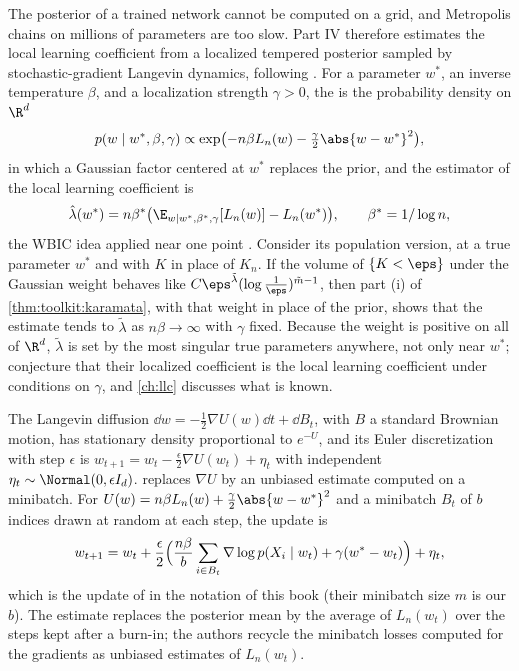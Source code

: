 \begin{refsection}
The posterior of a trained network cannot be computed on a grid, and Metropolis chains on millions of parameters are too slow. Part IV therefore estimates the local learning coefficient from a localized tempered posterior sampled by stochastic-gradient Langevin dynamics, following \textcite{LauEtAl2025}. For a parameter $w^*$, an inverse temperature $\beta$, and a localization strength $\gamma>0$, the  is the probability density on $\R^d$
\[
p(w\mid w^*,\beta,\gamma)\propto\exp\bigl(-n\beta L_n(w)-\tfrac\gamma2\abs{w-w^*}^2\bigr),
\]
in which a Gaussian factor centered at $w^*$ replaces the prior, and the estimator of the local learning coefficient is
\[
\hat\lambda(w^*)=n\beta^*\bigl(\E_{w\mid w^*,\beta^*,\gamma}[L_n(w)]-L_n(w^*)\bigr),\qquad\beta^*=1/\log n,
\]
the WBIC idea applied near one point \parencite[eqs.~(10) and (12)]{LauEtAl2025}. Consider its population version, at a true parameter $w^*$ and with $K$ in place of $K_n$. If the volume of $\{K<\eps\}$ under the Gaussian weight behaves like $C\eps^{\tilde\lambda}(\log\frac1\eps)^{\tilde m-1}$, then part (i) of \cref{thm:toolkit:karamata}, with that weight in place of the prior, shows that the estimate tends to $\tilde\lambda$ as $n\beta\to\infty$ with $\gamma$ fixed. Because the weight is positive on all of $\R^d$, $\tilde\lambda$ is set by the most singular true parameters anywhere, not only near $w^*$; \textcite{LauEtAl2025} conjecture that their localized coefficient is the local learning coefficient under conditions on $\gamma$, and \cref{ch:llc} discusses what is known.

The Langevin diffusion $\dd w=-\frac12\nabla U(w)\dd t+\dd B_t$, with $B$ a standard Brownian motion, has stationary density proportional to $e^{-U}$, and its Euler discretization with step $\epsilon$ is $w_{t+1}=w_t-\frac\epsilon2\nabla U(w_t)+\eta_t$ with independent $\eta_t\sim\Normal(0,\epsilon I_d)$.  replaces $\nabla U$ by an unbiased estimate computed on a minibatch. For $U(w)=n\beta L_n(w)+\frac\gamma2\abs{w-w^*}^2$ and a minibatch $B_t$ of $b$ indices drawn at random at each step, the update is
\begin{equation}\label{eq:toolkit:sgld}
w_{t+1}=w_t+\frac\epsilon2\Bigl(\frac{n\beta}b\sum_{i\in B_t}\nabla\log p(X_i\mid w_t)+\gamma(w^*-w_t)\Bigr)+\eta_t,
\end{equation}
which is the update of \textcite[Section~4.4]{LauEtAl2025} in the notation of this book (their minibatch size $m$ is our $b$). The estimate replaces the posterior mean by the average of $L_n(w_t)$ over the steps kept after a burn-in; the authors recycle the minibatch losses computed for the gradients as unbiased estimates of $L_n(w_t)$.


\end{refsection}
